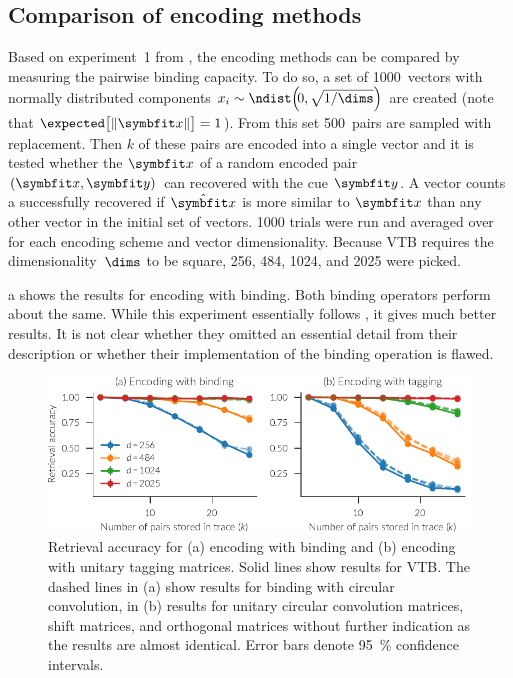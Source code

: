 \subsection{Comparison of encoding methods}
Based on experiment~1 from \textcite{recchia2015}, the encoding methods can be compared by measuring the pairwise binding capacity.
To do so, a set of \num{1000}~vectors with normally distributed components $x_i \sim \ndist\!\del{\!0, \sqrt{1/\dims}}$ are created (note that $\expected\!\sbr{\,\norm{\vc x}} = 1$).
From this set \num{500}~pairs are sampled with replacement.
Then $k$ of these pairs are encoded into a single vector and it is tested whether the $\vc x$ of a random encoded pair $(\vc x, \vc y)$ can recovered with the cue $\vc y$.
A vector counts a successfully recovered if $\hat{\vc x}$ is more similar to $\vc x$ than any other vector in the initial set of vectors.
\num{1000} trials were run and averaged over for each encoding scheme and vector dimensionality.
Because VTB requires the dimensionality~$\dims$ to be square, \num{256}, \num{484}, \num{1024}, and \num{2025} were picked.

a shows the results for encoding with binding.
Both binding operators perform about the same.
While this experiment essentially follows \textcite{recchia2015}, it gives much better results.
It is not clear whether they omitted an essential detail from their description or whether their implementation of the binding operation is flawed.
\begin{figure}
    \centering
    \includegraphics{figures/encoding}
    \caption[Retrieval accuracy of encoding methods.]{Retrieval accuracy for (a) encoding with binding and (b) encoding with unitary tagging matrices. Solid lines show results for VTB\@. The dashed lines in (a) show results for binding with circular convolution, in (b) results for unitary circular convolution matrices, shift matrices, and orthogonal matrices without further indication as the results are almost identical. Error bars denote \SI{95}{\percent} confidence intervals.}\label{fig:encoding}
\end{figure}

